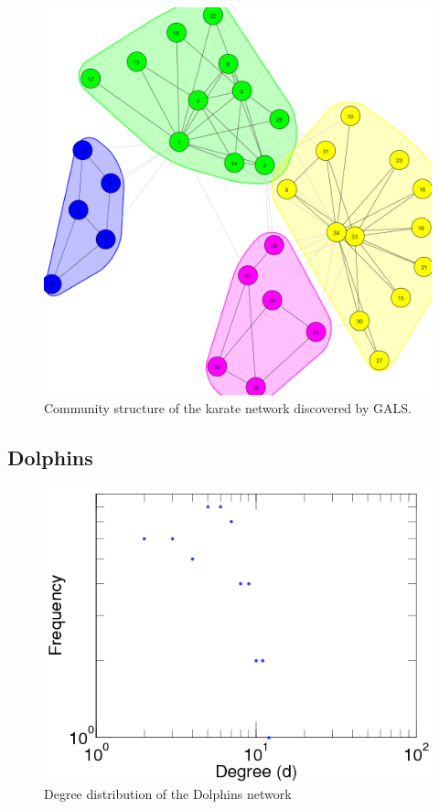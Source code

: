 \begin{figure}[!htb]
	\begin{center}
		\includegraphics[scale=.2]{images/gals_karate_com.png} 
	\end{center}
	\caption{Community structure of the karate network discovered by GALS.}
	\label{logo}
\end{figure}


\subsection{Dolphins}
\cite{Lusseau2003}
\begin{figure}[!htb]
	\begin{center}
		\includegraphics[scale=.4]{images/dolphins_degree_dist.png}
	\end{center}
	\caption{Degree distribution of the Dolphins network\cite{Kunegis2013}}
	\label{logo}
\end{figure}


